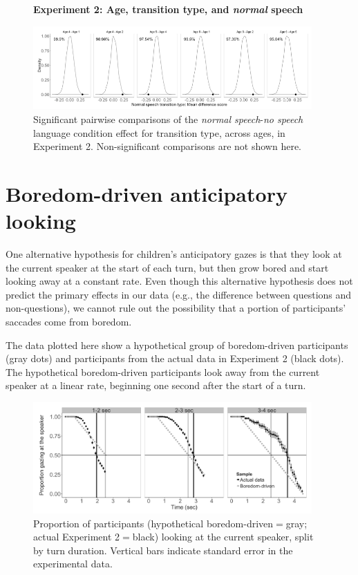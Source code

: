 \documentclass[authoryear, 12pt]{elsarticle}
\begin{document}
\begin{figure}
\begin{center}
\textbf{Experiment 2: Age, transition type, and \textit{normal} speech}\par\medskip
\includegraphics[width=0.95\textwidth]{figures/E2-child-randvsreal-ttest-normaltypesages.png}
\end{center}
\caption{Significant pairwise comparisons of the \textit{normal speech}-\textit{no speech} language condition effect for transition type, across ages, in Experiment 2. Non-significant comparisons are not shown here.}
\label{fig:E2-lgagetypeinteraction}
\end{figure}

\section{Boredom-driven anticipatory looking}
\label{sec:boredlooks}
\setcounter{figure}{0}

One alternative hypothesis for children's anticipatory gazes is that they look at the current speaker at the start of each turn, but then grow bored and start looking away at a constant rate. Even though this alternative hypothesis does not predict the primary effects in our data (e.g., the difference between questions and non-questions), we cannot rule out the possibility that a portion of participants' saccades come from boredom.

The data plotted here show a hypothetical group of boredom-driven participants (gray dots) and participants from the actual data in Experiment 2 (black dots). The hypothetical boredom-driven participants look away from the current speaker at a linear rate, beginning one second after the start of a turn.

\begin{figure}[!htb]
\begin{center}
\includegraphics[width=0.95\textwidth]{figures/boredom-hypothesis.png}
\end{center}
\caption{Proportion of participants (hypothetical boredom-driven$=$gray; actual Experiment 2$=$black) looking at the current speaker, split by turn duration. Vertical bars indicate standard error in the experimental data.}
\label{fig:boredomhypothesis}
\end{figure}
\end{document}

